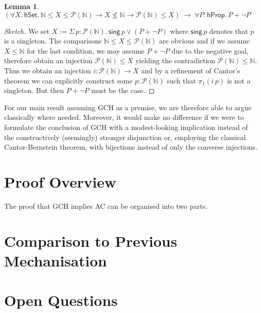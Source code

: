 \documentclass{easychair}
\newcommand{\nat}{\mathbb{N}}
\newcommand{\pow}{\mathcal{P}}
\newcommand{\hprop}{\mathsf{hProp}}
\newcommand{\hset}{\mathsf{hSet}}
\newtheorem{lemma}{Lemma}
\begin{document}
\begin{lemma}
	$(\forall X:\hset.\,\nat \le X\le \pow(\nat)\to X\not\le \nat\to \pow(\nat)\le X)~\to~\forall P:\hprop.\,P+\neg P$
\end{lemma}
\begin{proof}[Sketch]
	We set $X:=\Sigma\, p:\pow(\nat).\,\mathsf{sing}\,p\lor (P+\neg P)$ where $\mathsf{sing}\,p$ denotes that $p$ is a singleton.
	The comparisons $\nat \le X\le \pow(\nat)$ are obvious and if we assume $X\le\nat$ for the last condition, we may assume $P+\neg P$ due to the negative goal, therefore obtain an injection $\pow(\nat)\le X$ yielding the contradiction $\pow(\nat)\le \nat$.
	Thus we obtain an injection $i:\pow(\nat)\to X$ and by a refinement of Cantor's theorem we can explicitly construct some $p:\pow(\nat)$ such that $\pi_1(i\,p)$ is not a singleton.
	But then $P+\neg P$ must be the case.
\end{proof}

For our main result assuming GCH as a premise, we are therefore able to argue classically where needed.
Moreover, it would make no difference if we were to formulate the conclusion of GCH with a modest-looking implication instead of the constructively (seemingly) stronger disjunction or, employing the classical Cantor-Bernstein theorem, with bijections instead of only the converse injections.


\section{Proof Overview}

The proof that GCH implies AC can be organised into two parts.

\section{Comparison to Previous Mechanisation}

\section{Open Questions}



\scriptsize{}
\vspace{-20em}
\end{document}

